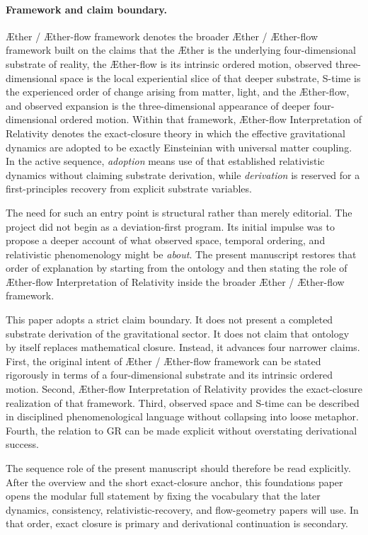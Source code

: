 \documentclass[11pt]{article}
\newcommand{\Aether}{\AE{}ther}
\newcommand{\Aflow}{\AE{}ther-flow}
\newcommand{\TheoryName}{\Aflow{} Interpretation of Relativity}
\newcommand{\TheoryProgram}{\Aether{} / \Aflow{} framework}
\begin{document}
\paragraph{Framework and claim boundary.}
\TheoryProgram{} denotes the broader \Aether{} / \Aflow{} framework built on the claims that the \Aether{} is the underlying four-dimensional substrate of reality, the \Aflow{} is its intrinsic ordered motion, observed three-dimensional space is the local experiential slice of that deeper substrate, S-time is the experienced order of change arising from matter, light, and the \Aflow{}, and observed expansion is the three-dimensional appearance of deeper four-dimensional ordered motion. Within that framework, \TheoryName{} denotes the exact-closure theory in which the effective gravitational dynamics are adopted to be exactly Einsteinian with universal matter coupling. In the active sequence, \emph{adoption} means use of that established relativistic dynamics without claiming substrate derivation, while \emph{derivation} is reserved for a first-principles recovery from explicit substrate variables.

The need for such an entry point is structural rather than merely editorial. The project did not begin as a deviation-first program. Its initial impulse was to propose a deeper account of what observed space, temporal ordering, and relativistic phenomenology might be \emph{about}. The present manuscript restores that order of explanation by starting from the ontology and then stating the role of \TheoryName{} inside the broader \TheoryProgram{}.

This paper adopts a strict claim boundary. It does not present a completed substrate derivation of the gravitational sector. It does not claim that ontology by itself replaces mathematical closure. Instead, it advances four narrower claims. First, the original intent of \TheoryProgram{} can be stated rigorously in terms of a four-dimensional substrate and its intrinsic ordered motion. Second, \TheoryName{} provides the exact-closure realization of that framework. Third, observed space and S-time can be described in disciplined phenomenological language without collapsing into loose metaphor. Fourth, the relation to GR can be made explicit without overstating derivational success.

The sequence role of the present manuscript should therefore be read explicitly. After the overview and the short exact-closure anchor, this foundations paper opens the modular full statement by fixing the vocabulary that the later dynamics, consistency, relativistic-recovery, and flow-geometry papers will use. In that order, exact closure is primary and derivational continuation is secondary.
\end{document}
